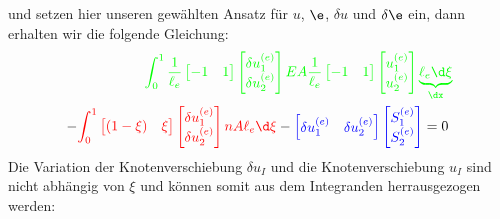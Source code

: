 \documentclass[letterpaper,10pt,german]{jupyterBook}
\begin{document}
und setzen hier unseren gewählten Ansatz für \(u\), \(\e\), \(\delta u\) und \(\delta \e\) ein, dann erhalten wir die folgende Gleichung:
\begin{equation}\label{equation:chapters/chapter2/1dFEM:stabFEM1}
\begin{split}\begin{align}
 \textcolor{green}{\int_{0}^{1} \frac{1}{\ell_e} \begin{bmatrix} -1 & 1 \end{bmatrix} \begin{bmatrix} \delta u_1^{(e)} \\ \delta u_2^{(e)}\end{bmatrix}  EA \frac{1}{\ell_e} \begin{bmatrix} -1 & 1 \end{bmatrix} \begin{bmatrix} u_1^{(e)} \\ u_2^{(e)}\end{bmatrix}   \underbrace{\ell_e \d \xi}_{\dx}} \\
 - \textcolor{red}{\int_0^{1} \begin{bmatrix} (1-\xi) & \xi \end{bmatrix} \begin{bmatrix} \delta u_1^{(e)} \\ \delta u_2^{(e)}\end{bmatrix}  n A \ell_e \d \xi} - \textcolor{blue}{\begin{bmatrix} \delta u_1^{(e)} & \delta u_2^{(e)}\end{bmatrix} \begin{bmatrix} S_1^{(e)} \\ S_2^{(e)} \end{bmatrix}}  = 0\; 
\end{align}\end{split}
\end{equation}
\sphinxAtStartPar
Die Variation der Knotenverschiebung \(\delta u_I\) und die Knotenverschiebung \(u_I\) sind nicht abhängig von \(\xi\) und können somit aus dem Integranden herrausgezogen werden:
\end{document}
